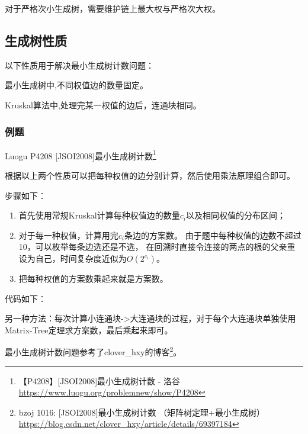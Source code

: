 对于严格次小生成树，需要维护链上最大权与严格次大权。

\subsection{生成树性质}
以下性质用于解决最小生成树计数问题：
\begin{property}
	最小生成树中,不同权值边的数量固定。
\end{property}
\begin{property}
	Kruskal算法中,处理完某一权值的边后，连通块相同。
\end{property}
\subsubsection{例题}

Luogu P4208 [JSOI2008]最小生成树计数\footnote{
【P4208】[JSOI2008]最小生成树计数 - 洛谷
\url{https://www.luogu.org/problemnew/show/P4208}
}

根据以上两个性质可以把每种权值的边分别计算，然后使用乘法原理组合即可。

步骤如下：
\begin{enumerate}
	\item 首先使用常规Kruskal计算每种权值边的数量$c_i$以及相同权值的分布区间；
	\item 对于每一种权值，计算用完$c_i$条边的方案数。
	      由于题中每种权值的边数不超过10，可以枚举每条边选还是不选，
	      在回溯时直接令连接的两点的根的父亲重设为自己，时间复杂度近似为$O(2^{c_i})$。
	\item 把每种权值的方案数乘起来就是方案数。
\end{enumerate}

代码如下：


另一种方法：每次计算小连通块->大连通块的过程，对于每个大连通块单独使用
Matrix-Tree定理求方案数，最后乘起来即可。

最小生成树计数问题参考了clover\_hxy的博客\footnote{
bzoj 1016: [JSOI2008]最小生成树计数 （矩阵树定理+最小生成树）
\url{https://blog.csdn.net/clover\_hxy/article/details/69397184}
}。
